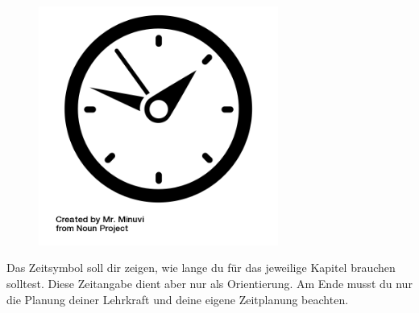 \documentclass{scrartcl}  %
\begin{document}
			\begin{tcolorbox}
				[enhanced,
				colback=white,
				colframe=black,
				fonttitle=\sffamily\bfseries\large, 
				title=Zeit,  %
				attach boxed title to top left={xshift=3.2mm,yshift=-0.40mm},
				boxed title style={skin=enhancedfirst
					jigsaw,size=small,arc=1mm,bottom=-1mm,colframe=black,height=0.75cm},
				colbacktitle=black,
				drop lifted shadow]
				\begin{figure}
					\centering
					\vspace{-14pt}  %
					\includegraphics[width=0.7\textwidth]{symbols/symbol_tex_time}
				\end{figure}
				
				Das Zeitsymbol soll dir zeigen, wie lange du für das jeweilige Kapitel brauchen solltest. Diese Zeitangabe dient aber nur als Orientierung. Am Ende musst du nur die Planung deiner Lehrkraft und deine eigene Zeitplanung beachten. 
				\vspace{1.0cm}  %
			\end{tcolorbox}
			
			
%				
%				
%				
\end{document}
